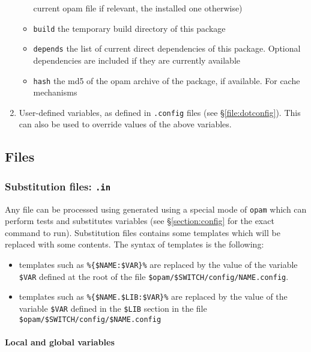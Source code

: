 \documentclass[a4paper,10pt]{article}
\begin{document}
\begin{enumerate}
\begin{itemize}
    current opam file if relevant, the installed one otherwise)
  \item \verb+build+ the temporary build directory of this package
  \item \verb+depends+ the list of current direct dependencies of this package.
    Optional dependencies are included if they are currently available
  \item \verb+hash+ the md5 of the opam archive of the package, if available.
    For cache mechanisms
  \end{itemize}
\item User-defined variables, as defined in {\tt *.config} files (see
  \S\ref{file:dotconfig}). This can also be used to override values of the above
  variables.
\end{enumerate}

\subsection{Files}

\subsubsection{Substitution files: {\tt *.in}}
\label{file:subst}

Any file can be processed using generated using a special mode of
{\tt opam} which can perform tests and substitutes variables (see
\S\ref{section:config} for the exact command to run). Substitution files
contains some templates which will be replaced with some contents. The
syntax of templates is the following:

\begin{itemize}

\item templates such as \verb+%{$NAME:$VAR}%+ are replaced by the value
  of the variable \verb+$VAR+ defined at the root of the file
  \verb+$opam/$SWITCH/config/NAME.config+.

\item templates such as \verb+%{$NAME.$LIB:$VAR}%+ are replaced by the
  value of the variable \verb+$VAR+ defined in the \verb+$LIB+ section
  in the file \verb+$opam/$SWITCH/config/$NAME.config+

\end{itemize}

\paragraph{Local and global variables}
\end{document}
